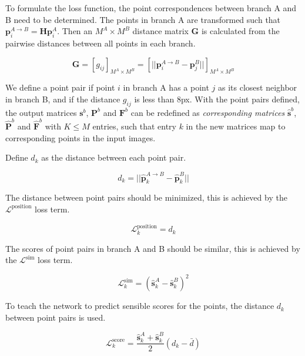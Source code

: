 To formulate the loss function, the point correspondences between branch A and B need to be determined. The points in branch A are transformed such that $\textbf{p}_i^{A\rightarrow B}=\textbf{H}\textbf{p}_i^A$. Then an $M^A\times M^B$ distance matrix $\textbf{G}$ is calculated from the pairwise distances between all points in each branch.

\begin{equation}
\textbf{G}=[g_{ij}]_{M^A\times M^B}=\left[||\textbf{p}_i^{A\rightarrow B}-\textbf{p}_j^B||\right]_{M^A\times M^B}
\end{equation}

We define a point pair if point $i$ in branch A has a point $j$ as its closest neighbor in branch B, and if the distance $g_{ij}$ is less than 8px. With the point pairs defined, the output matrices $\textbf{s}^b$, $\textbf{P}^b$ and $\textbf{F}^b$ can be redefined as \textit{corresponding matrices} $\hat{\textbf{s}}^b$, $\hat{\textbf{P}}^b$ and $\hat{\textbf{F}}^b$ with $K\le M$ entries, such that entry $k$ in the new matrices map to corresponding points in the input images.

Define $d_k$ as the distance between each point pair.

\begin{equation}
d_k=||\hat{\textbf{p}}_k^{A\rightarrow B}-\hat{\textbf{p}}_k^B||
\end{equation}

The distance between point pairs should be minimized, this is achieved by the $\mathcal{L}^{\textrm{position}}$ loss term.

\begin{equation}
\mathcal{L}_k^{\textrm{position}} = d_k
\end{equation}

The scores of point pairs in branch A and B should be similar, this is achieved by the $\mathcal{L}^{\textrm{sim}}$ loss term.

\begin{equation}
\mathcal{L}_k^{\textrm{sim}} = \left(\hat{\textbf{s}}_k^{A}-\hat{\textbf{s}}_k^B\right)^2
\end{equation}

To teach the network to predict sensible scores for the points, the distance $d_k$ between point pairs is used.

\begin{equation}
\mathcal{L}_k^{\textrm{score}}=\frac{\hat{\textbf{s}}_k^A+\hat{\textbf{s}}_k^B}{2}\left(d_k-\bar{d}\right)
\end{equation}

